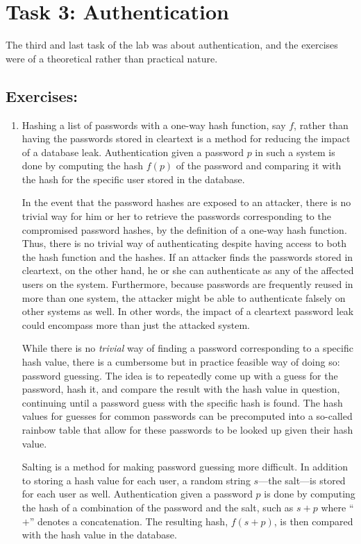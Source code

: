 \section*{Task 3: Authentication}
The third and last task of the lab was about authentication, and the exercises were of a theoretical rather than practical nature.
\subsection*{Exercises:}
\begin{enumerate}
\item %
Hashing a list of passwords with a one-way hash function, say $f$, rather than having the passwords stored in cleartext is a method for reducing the impact of a database leak. Authentication given a password $p$ in such a system is done by computing the hash $f(p)$ of the password and comparing it with the hash for the specific user stored in the database.

In the event that the password hashes are exposed to an attacker, there is no trivial way for him or her to retrieve the passwords corresponding to the compromised password hashes, by the definition of a one-way hash function. Thus, there is no trivial way of authenticating despite having access to both the hash function and the hashes. If an attacker finds the passwords stored in cleartext, on the other hand, he or she can authenticate as any of the affected users on the system. Furthermore, because passwords are frequently reused in more than one system, the attacker might be able to authenticate falsely on other systems as well. In other words, the impact of a cleartext password leak could encompass more than just the attacked system.

While there is no \emph{trivial} way of finding a password corresponding to a specific hash value, there is a cumbersome but in practice feasible way of doing so: password guessing. The idea is to repeatedly come up with a guess for the password, hash it, and compare the result with the hash value in question, continuing until a password guess with the specific hash is found. The hash values for guesses for common passwords can be precomputed into a so-called rainbow table that allow for these passwords to be looked up given their hash value.

Salting is a method for making password guessing more difficult. In addition to storing a hash value for each user, a random string $s$---the salt---is stored for each user as well. Authentication given a password $p$ is done by computing the hash of a combination of the password and the salt, such as $s + p$ where ``$+$'' denotes a concatenation. The resulting hash, $f(s + p)$, is then compared with the hash value in the database.


\end{enumerate}
